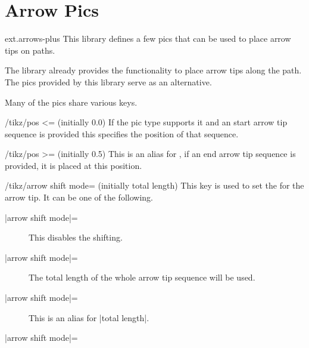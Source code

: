 %
%
%

\section{Arrow Pics}
\label{tikzlibrary:arrows}
\tikzset{external/export/.try=false}%
\begin{tikzlibrary}{ext.arrows-plus}
  This library defines a few pics that can be used to place arrow tips on paths.
\end{tikzlibrary}

\begin{multicols}{2}
The  library already provides the functionality
to place arrow tips along the path.
The pics provided by this library serve as an alternative.

Many of the pics share various keys.
\begin{key}{/tikz/pos <= (initially 0.0)}
If the pic type supports it and an start arrow tip sequence is provided
this specifies the position of that sequence.
\end{key}
\begin{key}{/tikz/pos >= (initially 0.5)}
This is an alias for ,
if an end arrow tip sequence is provided, it is placed at this position.
\end{key}

\begin{key}{/tikz/arrow shift mode= (initially total length)}
This key is used to set the  for the arrow tip.
It can be one of the following.
\begin{description}
\item[|arrow shift mode|=]

  This disables the shifting.
\item[|arrow shift mode|=]

  The total length of the whole arrow tip sequence will be used.
\item[|arrow shift mode|=]

  This is an alias for |total length|.
\item[|arrow shift mode|=]


\end{description}
\end{key}
\end{multicols}
